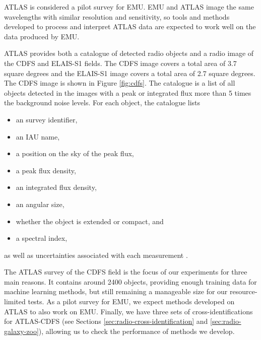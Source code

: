             ATLAS is considered a pilot survey for EMU. EMU and ATLAS image the
            same wavelengths with similar resolution and sensitivity, so tools
            and methods developed to process and interpret ATLAS data are
            expected to work well on the data produced by EMU.

            ATLAS provides both a catalogue of detected radio objects and a
            radio image of the CDFS and ELAIS-S1 fields. The CDFS image covers a
            total area of 3.7 square degrees and the ELAIS-S1 image covers a
            total area of 2.7 square degrees. The CDFS image is shown in Figure
            \ref{fig:cdfs}. The catalogue is a list of all objects detected in
            the images with a peak or integrated flux more than 5 times the
            background noise levels. For each object, the catalogue lists
            \begin{itemize}
                \setlength\itemsep{0 pt}
                \item an survey identifier,
                \item an IAU name,
                \item a position on the sky of the peak flux,
                \item a peak flux density,
                \item an integrated flux density,
                \item an angular size,
                \item whether the object is extended or compact, and
                \item a spectral index,
            \end{itemize}
            as well as uncertainties associated with each measurement
            \citep{franzen15}.

            The ATLAS survey of the CDFS field is the focus of our experiments
            for three main reasons. It contains around 2400 objects, providing
            enough training data for machine learning methods, but still
            remaining a manageable size for our resource-limited tests. As a
            pilot survey for EMU, we expect methods developed on ATLAS to also
            work on EMU. Finally, we have three sets of cross-identifications
            for ATLAS-CDFS (see Sections
            \ref{sec:radio-cross-identification} and
            \ref{sec:radio-galaxy-zoo}), allowing us to check the performance of
            methods we develop.

